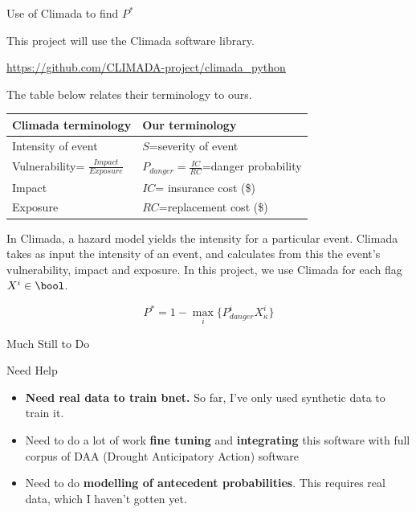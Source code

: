 \documentclass{beamer}
\begin{document}
\begin{frame}{Use of Climada to find $P^*$}

This project will use the Climada software library.

{\tiny \url{https://github.com/CLIMADA-project/climada_python}} 


The table below relates their 
terminology to ours.

\begin{tabular}{|l|l|}
\hline
\rowcolor[HTML]{FFFFC7} 
Climada terminology & Our terminology \\ \hline
Intensity of event & $S$=severity of event  \\ \hline
Vulnerability=
$\frac{Impact}{Exposure}$ & $P_{danger}= \frac{IC}{RC}$=danger probability \\ \hline
Impact & $IC$= insurance cost (\$) \\ \hline
Exposure & $RC$=replacement cost (\$) \\ \hline
\end{tabular}

In Climada, a hazard model 
yields the intensity
for a particular event.
Climada takes as 
input the intensity of an
event, and calculates from this the event's
vulnerability, impact and exposure.
In this
project, we use Climada for each flag $X^i\in\bool$.

$$
P^* =
1 -
\max_i\{P^i_{danger}
X_\kappa^i\}
$$

\end{frame}

\begin{frame}{Much Still to Do}

{\color{red} Need Help}

\begin{itemize}
\item {\bf Need real data to train bnet. 
} So far, I've only used synthetic  data to train it. 

\item Need to do a lot of work {\bf fine tuning} and
{\bf integrating} 
this software with full corpus of DAA 
(Drought Anticipatory Action) software

\item Need to do {\bf modelling of 
antecedent  probabilities}. This requires real data, which I haven't gotten yet.

\end{itemize}

\end{frame}
\end{document}
